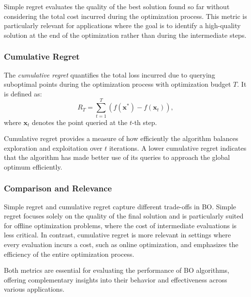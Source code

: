 Simple regret evaluates the quality of the best solution found so far without considering the total cost incurred during the optimization process. This metric is particularly relevant for applications where the goal is to identify a high-quality solution at the end of the optimization rather than during the intermediate steps.

\subsubsection{Cumulative Regret}

The \emph{cumulative regret} quantifies the total loss incurred due to querying suboptimal points during the optimization process with optimization budget $T$. It is defined as:
\[
R_T = \sum_{t=1}^T \left( f(\mathbf{x}^*) - f(\mathbf{x}_t) \right),
\]
where \( \mathbf{x}_t \) denotes the point queried at the \( t \)-th step. 

Cumulative regret provides a measure of how efficiently the algorithm balances exploration and exploitation over \( t \) iterations. A lower cumulative regret indicates that the algorithm has made better use of its queries to approach the global optimum efficiently.

\subsubsection{Comparison and Relevance}

Simple regret and cumulative regret capture different trade-offs in BO. Simple regret focuses solely on the quality of the final solution and is particularly suited for offline optimization problems, where the cost of intermediate evaluations is less critical. In contrast, cumulative regret is more relevant in settings where every evaluation incurs a cost, such as online optimization, and emphasizes the efficiency of the entire optimization process.

Both metrics are essential for evaluating the performance of BO algorithms, offering complementary insights into their behavior and effectiveness across various applications.

